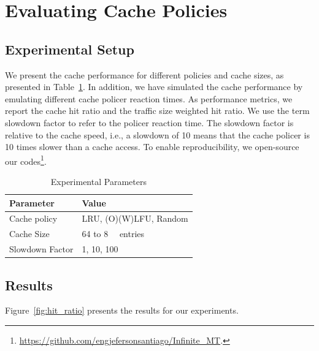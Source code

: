 \section{Evaluating Cache Policies}\label{sec:cache_results}

\subsection{Experimental Setup}
We present the cache performance for different policies and cache sizes, as presented in Table~\ref{tab:setup}.
In addition, we have simulated the cache performance by emulating different cache policer reaction times.
As performance metrics, we report the cache hit ratio and the traffic size weighted hit ratio.
We use the term slowdown factor to refer to the policer reaction time.
The slowdown factor is relative to the cache speed, i.e., a slowdown of 10 means that the cache policer is 10 times slower than a cache access.
To enable reproducibility, we open-source our codes\footnote{\url{https://github.com/engjefersonsantiago/Infinite_MT}.}.

\begin{table}[h]
	\centering
	\caption{Experimental Parameters}
	\label{tab:setup}
	\begin{tabular}{|l|l|}
		\hline
		\textbf{Parameter}       & \textbf{Value}   \\
		\hline
		Cache policy            & LRU, (O)(W)LFU, Random			    \\
		Cache Size              & 64 to \SI{8}{\kilo\nothing} entries  \\
		Slowdown Factor         & 1, 10, 100        \\
		\hline
	\end{tabular}
\end{table}

\subsection{Results}
Figure~\ref{fig:hit_ratio} presents the results for our experiments.

